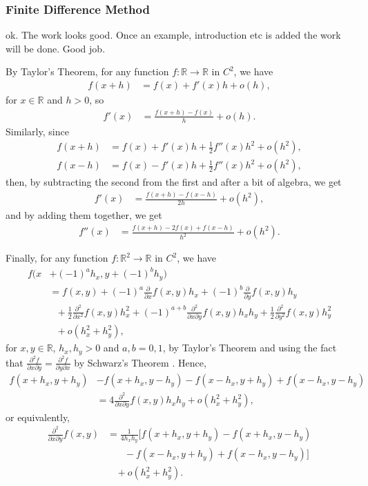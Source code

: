 \documentclass[english]{article}
\newcommand{\comment}[1]{\color{blue}#1\color{black}}
\numberwithin{equation}{section}
\numberwithin{figure}{section}
\theoremstyle{bolddescit}
\theoremstyle{definition}
\theoremstyle{definition}
\theoremstyle{plain}
\theoremstyle{plain}
\theoremstyle{bolddesc}
\theoremstyle{plain}
\theoremstyle{remark}
\begin{document}
\subsubsection{Finite Difference Method}

\comment{ok. The work looks good. Once an example, introduction etc is added the work will be done. Good job.}

By Taylor's Theorem, for any function $f : \mathbb{R} \to \mathbb{R}$ in $C^2$, we have
\begin{align*}
  f(x+h) &= f(x) + f'(x) h + o(h),
\end{align*}
for $x \in \mathbb{R}$ and $h > 0$, so
\begin{align*}
  f'(x) &= \frac{f(x+h) - f(x)}{h} + o(h).
\end{align*}
Similarly, since
\begin{align*}
  f(x+h) &= f(x) + f'(x) h + \frac{1}{2} f''(x) h^2 + o(h^2),\\
  f(x-h) &= f(x) - f'(x) h + \frac{1}{2} f''(x) h^2 + o(h^2),
\end{align*}
then, by subtracting the second from the first and after a bit of algebra, we get
\begin{align*}
  f'(x) &= \frac{f(x+h) - f(x-h)}{2h} + o(h^2),
\end{align*}
and by adding them together, we get
\begin{align*}
  f''(x) &= \frac{f(x+h) - 2f(x) + f(x-h)}{h^2} + o(h^2).
\end{align*}

Finally, for any function $f : \mathbb{R}^2 \to \mathbb{R}$ in $C^2$, we have
\begin{align*}
  f(x&+ (-1)^a h_x, y + (-1)^b h_y)\\
  &= f(x,y) + (-1)^a \frac{\partial}{\partial x} f(x,y) h_x + (-1)^b \frac{\partial}{\partial y} f(x,y) h_y\\
  &\ \ \ + \frac{1}{2} \frac{\partial^2}{\partial x^2} f(x,y) h_x^2 + (-1)^{a+b} \frac{\partial^2}{\partial x \partial y} f(x,y) h_x h_y + \frac{1}{2} \frac{\partial^2}{\partial y^2} f(x,y) h_y^2\\
  &\ \ \ + o(h_x^2 + h_y^2),
\end{align*}
for $x,y \in \mathbb{R}$, $h_x, h_y > 0$ and $a,b=0,1$, by Taylor's Theorem and using the fact that $\frac{\partial^2 f}{\partial x \partial y} = \frac{\partial^2 f}{\partial y \partial x}$ by Schwarz's Theorem . Hence,
\begin{align*}
  f(x+h_x,y+h_y) &- f(x+h_x,y-h_y) - f(x-h_x,y+h_y) + f(x-h_x,y-h_y)\\
  &= 4 \frac{\partial^2}{\partial x \partial y} f(x,y) h_x h_y + o(h_x^2 + h_y^2),
\end{align*}
or equivalently,
\begin{align*}
  \frac{\partial^2}{\partial x \partial y} f(x,y)
  &= \frac{1}{4 h_x h_y} [f(x+h_x,y+h_y) - f(x+h_x,y-h_y)\\
  &\ \ \ \ \ \ \ \ - f(x-h_x,y+h_y) + f(x-h_x,y-h_y)]\\
  &\ \ \ \ + o(h_x^2 + h_y^2).
\end{align*}
\end{document}
